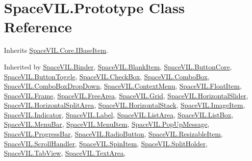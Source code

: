 \hypertarget{class_space_v_i_l_1_1_prototype}{}\section{Space\+V\+I\+L.\+Prototype Class Reference}
\label{class_space_v_i_l_1_1_prototype}


Inherits \mbox{\hyperlink{interface_space_v_i_l_1_1_core_1_1_i_base_item}{Space\+V\+I\+L.\+Core.\+I\+Base\+Item}}.



Inherited by \mbox{\hyperlink{class_space_v_i_l_1_1_binder}{Space\+V\+I\+L.\+Binder}}, \mbox{\hyperlink{class_space_v_i_l_1_1_blank_item}{Space\+V\+I\+L.\+Blank\+Item}}, \mbox{\hyperlink{class_space_v_i_l_1_1_button_core}{Space\+V\+I\+L.\+Button\+Core}}, \mbox{\hyperlink{class_space_v_i_l_1_1_button_toggle}{Space\+V\+I\+L.\+Button\+Toggle}}, \mbox{\hyperlink{class_space_v_i_l_1_1_check_box}{Space\+V\+I\+L.\+Check\+Box}}, \mbox{\hyperlink{class_space_v_i_l_1_1_combo_box}{Space\+V\+I\+L.\+Combo\+Box}}, \mbox{\hyperlink{class_space_v_i_l_1_1_combo_box_drop_down}{Space\+V\+I\+L.\+Combo\+Box\+Drop\+Down}}, \mbox{\hyperlink{class_space_v_i_l_1_1_context_menu}{Space\+V\+I\+L.\+Context\+Menu}}, \mbox{\hyperlink{class_space_v_i_l_1_1_float_item}{Space\+V\+I\+L.\+Float\+Item}}, \mbox{\hyperlink{class_space_v_i_l_1_1_frame}{Space\+V\+I\+L.\+Frame}}, \mbox{\hyperlink{class_space_v_i_l_1_1_free_area}{Space\+V\+I\+L.\+Free\+Area}}, \mbox{\hyperlink{class_space_v_i_l_1_1_grid}{Space\+V\+I\+L.\+Grid}}, \mbox{\hyperlink{class_space_v_i_l_1_1_horizontal_slider}{Space\+V\+I\+L.\+Horizontal\+Slider}}, \mbox{\hyperlink{class_space_v_i_l_1_1_horizontal_split_area}{Space\+V\+I\+L.\+Horizontal\+Split\+Area}}, \mbox{\hyperlink{class_space_v_i_l_1_1_horizontal_stack}{Space\+V\+I\+L.\+Horizontal\+Stack}}, \mbox{\hyperlink{class_space_v_i_l_1_1_image_item}{Space\+V\+I\+L.\+Image\+Item}}, \mbox{\hyperlink{class_space_v_i_l_1_1_indicator}{Space\+V\+I\+L.\+Indicator}}, \mbox{\hyperlink{class_space_v_i_l_1_1_label}{Space\+V\+I\+L.\+Label}}, \mbox{\hyperlink{class_space_v_i_l_1_1_list_area}{Space\+V\+I\+L.\+List\+Area}}, \mbox{\hyperlink{class_space_v_i_l_1_1_list_box}{Space\+V\+I\+L.\+List\+Box}}, \mbox{\hyperlink{class_space_v_i_l_1_1_menu_bar}{Space\+V\+I\+L.\+Menu\+Bar}}, \mbox{\hyperlink{class_space_v_i_l_1_1_menu_item}{Space\+V\+I\+L.\+Menu\+Item}}, \mbox{\hyperlink{class_space_v_i_l_1_1_pop_up_message}{Space\+V\+I\+L.\+Pop\+Up\+Message}}, \mbox{\hyperlink{class_space_v_i_l_1_1_progress_bar}{Space\+V\+I\+L.\+Progress\+Bar}}, \mbox{\hyperlink{class_space_v_i_l_1_1_radio_button}{Space\+V\+I\+L.\+Radio\+Button}}, \mbox{\hyperlink{class_space_v_i_l_1_1_resizable_item}{Space\+V\+I\+L.\+Resizable\+Item}}, \mbox{\hyperlink{class_space_v_i_l_1_1_scroll_handler}{Space\+V\+I\+L.\+Scroll\+Handler}}, \mbox{\hyperlink{class_space_v_i_l_1_1_spin_item}{Space\+V\+I\+L.\+Spin\+Item}}, \mbox{\hyperlink{class_space_v_i_l_1_1_split_holder}{Space\+V\+I\+L.\+Split\+Holder}}, \mbox{\hyperlink{class_space_v_i_l_1_1_tab_view}{Space\+V\+I\+L.\+Tab\+View}}, \mbox{\hyperlink{class_space_v_i_l_1_1_text_area}{Space\+V\+I\+L.\+Text\+Area}}, 